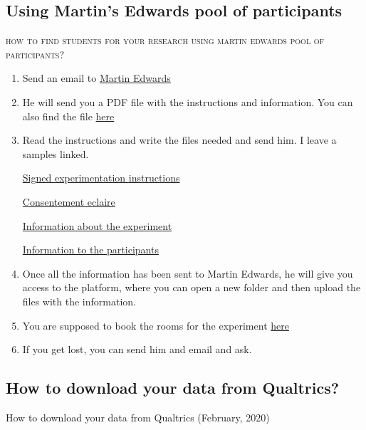 \documentclass{article}
\begin{document}
\subsection{Using Martin's Edwards pool of participants}
\label{subsec: Martin}
\textsc{how to find students for your research using martin edwards pool of participants?}
\begin{enumerate}
    \item Send an email to \href{martin.edwards@uclouvain.be}{ Martin Edwards}
    \item He will send you a PDF file with the instructions and information. You can also find the file \href{https://uclouvain-my.sharepoint.com/:f:/g/personal/carlos_alcala_uclouvain_be/EmwYTCf0VTBKm5ce0Nf_TRYB_VKXQbs4sqOtW1MwRyzAyw?e=5RpmwF}{here}
    \item Read the instructions and write the files needed and send him. I leave a samples linked.
    
    \href{https://uclouvain-my.sharepoint.com/:b:/g/personal/carlos_alcala_uclouvain_be/EaWQ80YJY8tLqHQrZkXlEn4B6N1usGtCU9Ab-w-70-gI8Q?e=3hnbB1}{Signed experimentation instructions}
    
    \href{https://uclouvain-my.sharepoint.com/:w:/g/personal/carlos_alcala_uclouvain_be/EedncL2exzBElNTLh96RxE0B8yf0Zs67iWZ7M8VqDEIXmw?e=sFNc5Z}{Consentement eclaire}
    
    \href{https://uclouvain-my.sharepoint.com/:w:/g/personal/carlos_alcala_uclouvain_be/Eek6vCacUeNPnDZGVa4Df6YBCRkqaAqJ8SqiSNHXUixhBQ?e=KGjP9L}{Information about the experiment}
    
    \href{
https://uclouvain-my.sharepoint.com/:w:/g/personal/carlos_alcala_uclouvain_be/EaKt779vejZMq4uhbPjtS1ABOG7xuaTgr2IpeSuw-y8how?e=wqOlaO
}{Information to the participants}

    \item Once all the information has been sent to Martin Edwards, he will give you access to the platform, where you can open a new folder and then upload the files with the information. 
    \item 	You are supposed to book the rooms for the experiment \href{https://sites.uclouvain.be/reservation-psp/login.php}{here} 
    \item If you get lost, you can send him and email and ask.
\end{enumerate}

\subsection{How to download your data from Qualtrics?}
How to download your data from Qualtrics (February, 2020)
\end{document}

